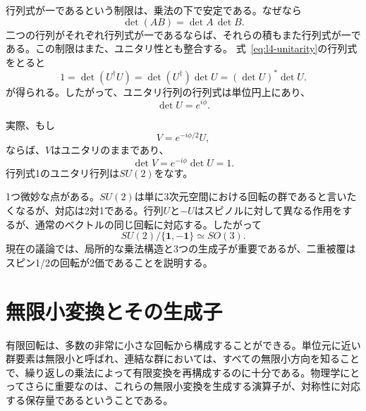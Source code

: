 行列式が一であるという制限は、乗法の下で安定である。なぜなら
\begin{equation}
\det(AB)=\det A\,\det B.
\end{equation}
二つの行列がそれぞれ行列式が一であるならば、それらの積もまた行列式が一である。この制限はまた、ユニタリ性とも整合する。
式~\eqref{eq:l4-unitarity}の行列式をとると
\begin{equation}
1=\det(U^\dagger U)
=\det(U^\dagger)\det U
=(\det U)^*\det U.
\end{equation}
が得られる。したがって、ユニタリ行列の行列式は単位円上にあり、
\begin{equation}
\det U=e^{i\phi}.
\end{equation}

\begin{classroomqa}
\end{classroomqa}

実際、もし
\begin{equation}
V=e^{-i\phi/2}U,
\end{equation}
ならば、\(V\)はユニタリのままであり、
\begin{equation}
\det V=e^{-i\phi}\det U=1.
\end{equation}
行列式1のユニタリ行列は\(SU(2)\)をなす。

1つ微妙な点がある。\(SU(2)\)は単に3次元空間における回転の群であると言いたくなるが、対応は2対1である。行列\(U\)と\(-U\)はスピノルに対して異なる作用をするが、通常のベクトルの同じ回転に対応する。したがって
\begin{equation}
SU(2)/\{\boldsymbol 1,-\boldsymbol 1\}\simeq SO(3).
\end{equation}
現在の議論では、局所的な乗法構造と3つの生成子が重要であるが、二重被覆はスピン1/2の回転が2価であることを説明する。

\section{無限小変換とその生成子}

有限回転は、多数の非常に小さな回転から構成することができる。単位元に近い群要素は無限小と呼ばれ、連結な群においては、すべての無限小方向を知ることで、繰り返しの乗法によって有限変換を再構成するのに十分である。物理学にとってさらに重要なのは、これらの無限小変換を生成する演算子が、対称性に対応する保存量であるということである。

